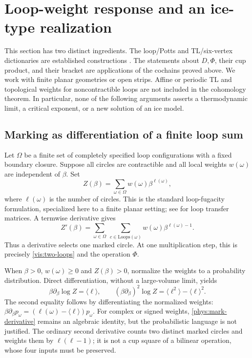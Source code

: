\documentclass[a4paper,11pt,oneside,reqno]{amsart}
\theoremstyle{definition}
\numberwithin{equation}{section}
\begin{document}
	
\section{Loop-weight response and an ice-type realization}
\label{phys:section}
This section has two distinct ingredients. The loop/Potts and TL/six-vertex
dictionaries are established constructions \cite{TemperleyLieb,BKW,BJJZ}.
The statements about $D,\Phi$, their cup product, and their bracket are
applications of the cochains proved above. We work with finite planar
geometries or open strips. Affine or periodic TL and topological weights
for noncontractible loops are not included in the cohomology theorem.
In particular, none of the following arguments asserts a thermodynamic
limit, a critical exponent, or a new solution of an ice model.

\subsection{Marking as differentiation of a finite loop sum}
Let $\Omega$ be a finite set of completely specified loop configurations
with a fixed boundary closure. Suppose all circles are contractible and
all local weights $w(\omega)$ are independent of $\beta$. Set
\begin{equation}\label{phys:Z}
 Z(\beta)=\sum_{\omega\in\Omega}w(\omega)\beta^{\ell(\omega)},
\end{equation}
where $\ell(\omega)$ is the number of circles. This is the standard
loop-fugacity formulation, specialized here to a finite planar setting;
see \cite[Sections~2.1 and 4]{BJJZ} for loop transfer matrices.
A termwise derivative gives
\begin{equation}\label{phys:mark-derivative}
 Z'(\beta)=\sum_{\omega\in\Omega}\ \sum_{c\in\mathrm{Loops}(\omega)}
 w(\omega)\beta^{\ell(\omega)-1}.
\end{equation}
Thus a derivative selects one marked circle. At one multiplication step,
this is precisely \eqref{vis:two-loops} and the operation $\Phi$.

When $\beta>0$, $w(\omega)\ge0$ and $Z(\beta)>0$, normalize the weights
to a probability distribution. Direct differentiation, without a
large-volume limit, yields
\begin{equation}\label{phys:expectation}
 \beta\partial_\beta\log Z=\langle\ell\rangle,
 \qquad (\beta\partial_\beta)^2\log Z=
 \langle\ell^2\rangle-\langle\ell\rangle^2.
\end{equation}
The second equality follows by differentiating the normalized weights:
$\beta\partial_\beta p_\omega=(\ell(\omega)-\langle\ell\rangle)p_\omega$.
For complex or signed weights, \eqref{phys:mark-derivative} remains an
algebraic identity, but the probabilistic language is not justified.
The ordinary second derivative counts two distinct marked circles and
weights them by $\ell(\ell-1)$; it is not a cup square of a bilinear
operation, whose four inputs must be preserved.
\end{document}
